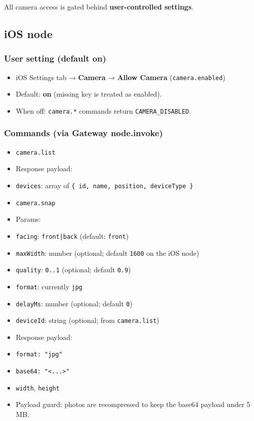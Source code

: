 All camera access is gated behind \textbf{user-controlled settings}.

\subsection{iOS node}


\subsubsection{User setting (default on)}


\begin{itemize}
  \item iOS Settings tab → \textbf{Camera} → \textbf{Allow Camera} (\texttt{camera.enabled})
  \item Default: \textbf{on} (missing key is treated as enabled).
  \item When off: \texttt{camera.*} commands return \texttt{CAMERA\_DISABLED}.
\end{itemize}


\subsubsection{Commands (via Gateway node.invoke)}


\begin{itemize}
  \item \texttt{camera.list}
  \item Response payload:
  \item \texttt{devices}: array of \texttt{\{ id, name, position, deviceType \}}
\end{itemize}


\begin{itemize}
  \item \texttt{camera.snap}
  \item Params:
  \item \texttt{facing}: \texttt{front|back} (default: \texttt{front})
  \item \texttt{maxWidth}: number (optional; default \texttt{1600} on the iOS node)
  \item \texttt{quality}: \texttt{0..1} (optional; default \texttt{0.9})
  \item \texttt{format}: currently \texttt{jpg}
  \item \texttt{delayMs}: number (optional; default \texttt{0})
  \item \texttt{deviceId}: string (optional; from \texttt{camera.list})
  \item Response payload:
  \item \texttt{format: "jpg"}
  \item \texttt{base64: "<...>"}
  \item \texttt{width}, \texttt{height}
  \item Payload guard: photos are recompressed to keep the base64 payload under 5 MB.
\end{itemize}


